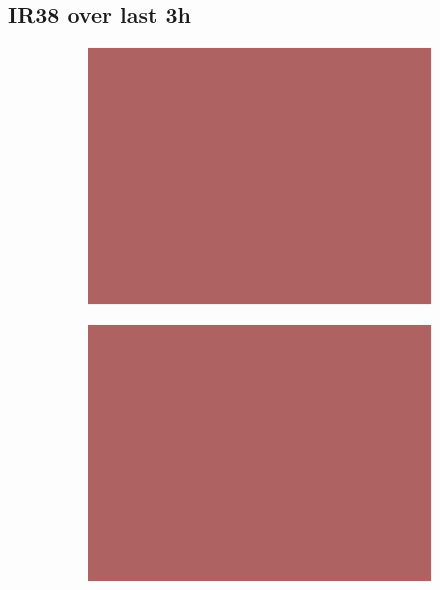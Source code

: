 \documentclass{article}
\begin{document}
\subsection*{IR38 over last 3h}
\vspace{-1em}
\begin{figure}[H]
    \centering
    \begin{subfigure}[b]{0.32\textwidth}
        \centering
        \includegraphics[width=\linewidth]{ir38_184_h0.png} %
    \end{subfigure}
    \begin{subfigure}[b]{0.32\textwidth}
        \centering
        \includegraphics[width=\linewidth]{ir38_184_h1.png} %

\end{subfigure}
\end{figure}
\end{document}
